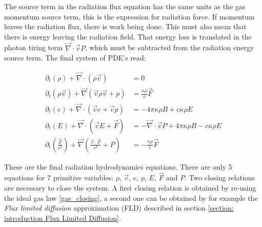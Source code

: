 The source term in the radiation flux equation has the same units as the gas momentum source term, this is the expression for radiation force. If momentum leaves the radiation flux, there is work being done. This must also mean that there is energy leaving the radiation field. That energy loss is translated in the photon tiring term $\vec{\nabla} \cdot \vec{v} P$, which must be subtracted from the radiation energy source term. The final system of PDE's read:

\begin{align}
 \partial_t \left(\rho \right) + \vec{\nabla} \cdot \left( \rho \vec{v}  \right) &= 0 \label{eq: rhd_cont} \\
 \partial_t \left(\rho \vec{v} \right) + \vec{\nabla} \left( \vec{v} \rho \vec{v} + p \right) 
 &= \frac{\kappa \rho}{c} \vec{F} \label{eq: rhd_mom} \\
 \partial_t \left(e \right) + \vec{\nabla} \cdot \left( \vec{v} e + \vec{v} p \right) &= -4\pi \kappa\rho B + c \kappa \rho E \label{eq: rhd_e}\\
 \partial_t \left(E \right) +  \vec{\nabla} \cdot \left( \vec{v} E + \vec{F} \right) &=  -\vec{\nabla} \cdot \vec{v} P + 4\pi \kappa\rho B - c \kappa \rho E \label{eq: rhd_e_r} \\
 \partial_t \left(\frac{\vec{F}}{c^2} \right) +  \vec{\nabla} \left( \frac{\vec{v} \cdot \vec{F}}{c^2} + P \right) &= - \frac{\kappa \rho}{c} \vec{F} \label{eq: rhd_flux}
\end{align}

These are the final radiation hydrodynamics equations. There are only 5 equations for 7 primitive variables: $\rho$, $\vec{v}$, $e$, $p$, $E$, $\vec{F}$ and $P$. Two closing relations are necessary to close the system. A first closing relation is obtained by re-using the ideal gas law \eqref{gas_closing}, a second one can be obtained by for example the \emph{Flux limited diffusion} approximation (FLD) described in section \ref{section: introduction Flux Limited Diffusion}.

